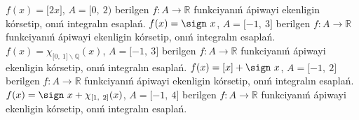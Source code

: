 \(f(x) = \lbrack 2x\rbrack\), \(A = \lbrack 0,\ 2)\) berilgen \(f:A\rightarrow\mathbb{R}\) funkciyanıń ápiwayi ekenligin kórsetip, onıń integralın esaplań.
\(f(x) = \sign \ x\), \(A = \lbrack - 1,\ 3\rbrack\) berilgen \(f:A\rightarrow\mathbb{R}\) funkciyanıń ápiwayi ekenligin kórsetip, onıń integralın esaplań.
\(f(x) = \chi_{\lbrack 0,\ 1\rbrack\backslash\mathbb{Q}}(x)\), \(A = \lbrack - 1,\ 3\rbrack\) berilgen \(f:A\rightarrow\mathbb{R}\) funkciyanıń ápiwayi ekenligin kórsetip, onıń integralın esaplań.
\(f(x) = \lbrack x\rbrack + \sign \ x\), \(A = \lbrack - 1,\ 2\rbrack\) berilgen \(f:A\rightarrow\mathbb{R}\) funkciyanıń ápiwayi ekenligin kórsetip, onıń integralın esaplań.
\(f(x) = \sign \ x + \chi_{\lbrack 1,\ 2\rbrack}(x)\), \(A = \lbrack - 1,\ 4\rbrack\) berilgen \(f:A\rightarrow\mathbb{R}\) funkciyanıń ápiwayi ekenligin kórsetip, onıń integralın esaplań.